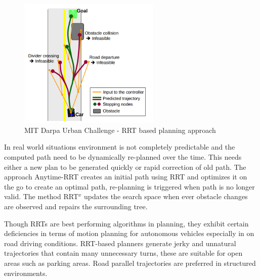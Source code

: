 \begin{figure}
	\centering
	\includegraphics[width=0.6\textwidth]{Images/related_work/mit_urban_planning.png}
	\caption{MIT Darpa Urban Challenge - RRT based planning approach}
	\label{mit_rrt_fig}
\end{figure} 

In real world situations environment is not completely predictable and the computed path need to be dynamically re-planned over the time. This needs either a new plan to be generated quickly or rapid correction of old path. The approach Anytime-RRT \cite{anytimerrt} creates an initial path using RRT and optimizes it on the go to create an optimal path, re-planning is triggered when path is no longer valid. The method RRT$^x$ \cite{rrtx} updates the search space when ever obstacle changes are observed and repairs the surrounding tree. 

Though RRTs are best performing algorithms in planning, they exhibit certain deficiencies in terms of motion planning for autonomous vehicles especially in on road driving conditions.  RRT-based planners generate jerky and unnatural trajectories that contain many unnecessary turns\cite{improved_rrt}, these are suitable for open areas such as parking areas. Road parallel trajectories are preferred in structured environments. 

